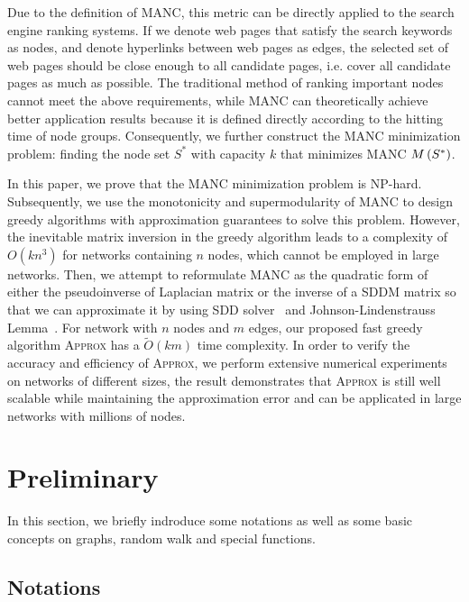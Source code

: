 \documentclass[sigconf]{acmart}
\begin{document}
Due to the definition of MANC, this metric can be directly applied to the search engine ranking systems.
If we denote web pages that satisfy the search keywords as nodes, and denote hyperlinks between web pages as edges, the selected set of web pages should be close enough to all candidate pages, i.e. cover all candidate pages as much as possible.
The traditional method of ranking important nodes cannot meet the above requirements, while MANC can theoretically achieve better application results because it is defined directly according to the hitting time of node groups.
Consequently, we further construct the MANC minimization problem: finding the node set \(S^*\) with capacity \(k\) that minimizes MANC \(M\left(S^*\right)\).

In this paper, we prove that the MANC minimization problem is NP-hard.
Subsequently, we use the monotonicity and supermodularity of MANC to design greedy algorithms with approximation guarantees to solve this problem.
However, the inevitable matrix inversion in the greedy algorithm leads to a complexity of \(O(kn^3)\) for networks containing \(n\) nodes, which cannot be employed in large networks.
Then, we attempt to reformulate MANC as the quadratic form of either the pseudoinverse of Laplacian matrix or the inverse of a SDDM matrix so that we can approximate it by using SDD solver~\cite{CoKyMiPaJaPeRaXu14,SpTe14} and Johnson-Lindenstrauss Lemma~\cite{JoLi84}.
For network with \(n\) nodes and \(m\) edges, our proposed fast greedy algorithm \textsc{Approx} has a \(\tilde{O}(km)\) time complexity.
In order to verify the accuracy and efficiency of \textsc{Approx}, we perform extensive numerical experiments on networks of different sizes, the result demonstrates that \textsc{Approx} is still well scalable while maintaining the approximation error and can be applicated in large networks with millions of nodes.

\section{Preliminary}\label{sec:prelim}

In this section, we briefly indroduce some notations as well as some basic concepts on graphs, random walk and special functions.

\subsection{Notations}
\end{document}
